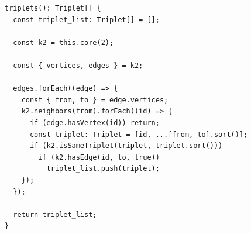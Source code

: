 \begin{verbatim}
triplets(): Triplet[] {
  const triplet_list: Triplet[] = [];

  const k2 = this.core(2);

  const { vertices, edges } = k2;

  edges.forEach((edge) => {
    const { from, to } = edge.vertices;
    k2.neighbors(from).forEach((id) => {
      if (edge.hasVertex(id)) return;
      const triplet: Triplet = [id, ...[from, to].sort()];
      if (k2.isSameTriplet(triplet, triplet.sort()))
        if (k2.hasEdge(id, to, true))
          triplet_list.push(triplet);
    });
  });

  return triplet_list;
}
\end{verbatim}
